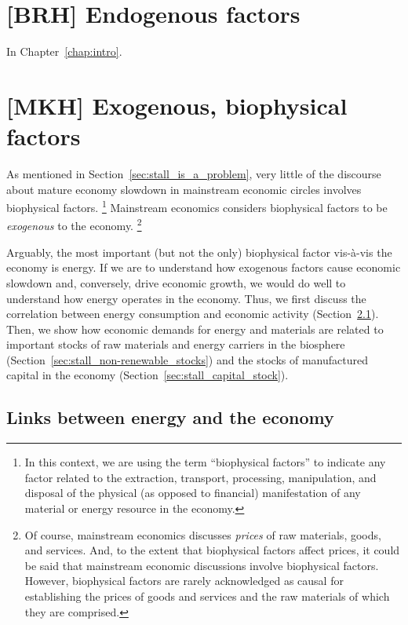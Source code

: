 \section{[BRH] Endogenous factors}
\label{sec:endogenous_factors}

In Chapter~\ref{chap:intro}.


\section{[MKH] Exogenous, biophysical factors}
\label{sec:exogenous_factors}

As mentioned in Section~\ref{sec:stall_is_a_problem}, 
very little of the discourse 
about mature economy slowdown 
in mainstream economic circles
involves biophysical factors.%
	\footnote{
	In this context, we are using the term ``biophysical factors''
	to indicate any factor related to 
	the extraction, transport, processing, manipulation, and disposal 
	of the physical (as opposed to financial) manifestation 
	of any material or energy resource in the economy.
	}
Mainstream economics considers biophysical factors
to be \emph{exogenous} to the economy.%
	\footnote{
	Of course, mainstream economics discusses \emph{prices}
	of raw materials, goods, and services. 
	And, to the extent that biophysical factors affect prices,
	it could be said that mainstream economic discussions involve
	biophysical factors.
	However, biophysical factors are rarely acknowledged as causal 
	for establishing the prices of goods and services and the raw materials 
	of which they are comprised.
	}

Arguably, the most important (but not the only) biophysical factor 
vis-\`{a}-vis the economy is energy.
If we are to understand how exogenous factors cause economic slowdown
and, conversely, drive economic growth,
we would do well to understand how energy operates in the economy.
Thus, we first discuss the correlation 
between energy consumption and economic activity 
(Section~\ref{sec:energy-economy_links}).
Then, we show how economic demands for energy and materials
are related to important stocks 
of raw materials and energy carriers in the biosphere 
(Section~\ref{sec:stall_non-renewable_stocks})
and the stocks of manufactured capital in the economy
(Section~\ref{sec:stall_capital_stock}).


\subsection{Links between energy and the economy}
\label{sec:energy-economy_links}

